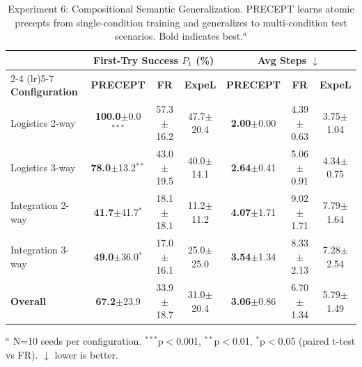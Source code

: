 \begin{table}[t]
\centering
\caption{Experiment 6: Compositional Semantic Generalization. PRECEPT learns atomic precepts from single-condition training and generalizes to multi-condition test scenarios. Bold indicates best.$^a$}
\label{tab:exp6}
\begin{tabular}{l ccc ccc}
\toprule
& \multicolumn{3}{c}{\textbf{First-Try Success $P_1$ (\%)}} & \multicolumn{3}{c}{\textbf{Avg Steps} $\downarrow$} \\
\cmidrule(lr){2-4} \cmidrule(lr){5-7}
\textbf{Configuration} & \textbf{PRECEPT} & \textbf{FR} & \textbf{ExpeL} & \textbf{PRECEPT} & \textbf{FR} & \textbf{ExpeL} \\
\midrule
Logistics 2-way & \textbf{100.0}$\pm$0.0$^{***}$ & 57.3$\pm$16.2 & 47.7$\pm$20.4 & \textbf{2.00}$\pm$0.00 & 4.39$\pm$0.63 & 3.75$\pm$1.04 \\
Logistics 3-way & \textbf{78.0}$\pm$13.2$^{**}$ & 43.0$\pm$19.5 & 40.0$\pm$14.1 & \textbf{2.64}$\pm$0.41 & 5.06$\pm$0.91 & 4.34$\pm$0.75 \\
Integration 2-way & \textbf{41.7}$\pm$41.7$^{*}$ & 18.1$\pm$18.1 & 11.2$\pm$11.2 & \textbf{4.07}$\pm$1.71 & 9.02$\pm$1.71 & 7.79$\pm$1.64 \\
Integration 3-way & \textbf{49.0}$\pm$36.0$^{*}$ & 17.0$\pm$16.1 & 25.0$\pm$25.0 & \textbf{3.54}$\pm$1.34 & 8.33$\pm$2.13 & 7.28$\pm$2.54 \\
\midrule
\textbf{Overall} & \textbf{67.2}$\pm$23.9 & 33.9$\pm$18.7 & 31.0$\pm$20.4 & \textbf{3.06}$\pm$0.86 & 6.70$\pm$1.34 & 5.79$\pm$1.49 \\
\bottomrule
\end{tabular}

\vspace{2mm}
\footnotesize
$^a$ N=10 seeds per configuration. $^{***}$p$<$0.001, $^{**}$p$<$0.01, $^{*}$p$<$0.05 (paired t-test vs FR). $\downarrow$ lower is better.
\end{table}
